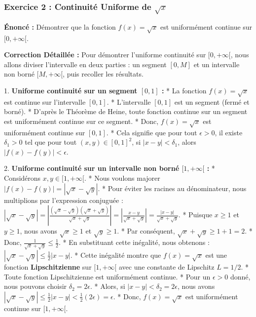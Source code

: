 \documentclass[12pt,a4paper]{report}
\begin{document}
\subsubsection{Exercice 2 : Continuité Uniforme de $\sqrt{x}$}
\textbf{Énoncé :} Démontrer que la fonction $f(x) = \sqrt{x}$ est uniformément continue sur $[0, +\infty[$.

\textbf{Correction Détaillée :}
Pour démontrer l'uniforme continuité sur $[0, +\infty[$, nous allons diviser l'intervalle en deux parties : un segment $[0, M]$ et un intervalle non borné $[M, +\infty[$, puis recoller les résultats.

1.  \textbf{Uniforme continuité sur un segment $[0, 1]$ :}
    *   La fonction $f(x) = \sqrt{x}$ est continue sur l'intervalle $[0, 1]$.
    *   L'intervalle $[0, 1]$ est un segment (fermé et borné).
    *   D'après le Théorème de Heine, toute fonction continue sur un segment est uniformément continue sur ce segment.
    *   Donc, $f(x) = \sqrt{x}$ est uniformément continue sur $[0, 1]$.
    *   Cela signifie que pour tout $\epsilon > 0$, il existe $\delta_1 > 0$ tel que pour tout $(x, y) \in [0, 1]^2$, si $|x - y| < \delta_1$, alors $|f(x) - f(y)| < \epsilon$.

2.  \textbf{Uniforme continuité sur un intervalle non borné $[1, +\infty[$ :}
    *   Considérons $x, y \in [1, +\infty[$.
    *   Nous voulons majorer $|f(x) - f(y)| = |\sqrt{x} - \sqrt{y}|$.
    *   Pour éviter les racines au dénominateur, nous multiplions par l'expression conjuguée :
        $|\sqrt{x} - \sqrt{y}| = \left|\frac{(\sqrt{x} - \sqrt{y})(\sqrt{x} + \sqrt{y})}{\sqrt{x} + \sqrt{y}}\right| = \left|\frac{x - y}{\sqrt{x} + \sqrt{y}}\right| = \frac{|x - y|}{\sqrt{x} + \sqrt{y}}$.
    *   Puisque $x \ge 1$ et $y \ge 1$, nous avons $\sqrt{x} \ge 1$ et $\sqrt{y} \ge 1$.
    *   Par conséquent, $\sqrt{x} + \sqrt{y} \ge 1 + 1 = 2$.
    *   Donc, $\frac{1}{\sqrt{x} + \sqrt{y}} \le \frac{1}{2}$.
    *   En substituant cette inégalité, nous obtenons :
        $|\sqrt{x} - \sqrt{y}| \le \frac{1}{2} |x - y|$.
    *   Cette inégalité montre que $f(x) = \sqrt{x}$ est une fonction \textbf{Lipschitzienne} sur $[1, +\infty[$ avec une constante de Lipschitz $L = 1/2$.
    *   Toute fonction Lipschitzienne est uniformément continue.
    *   Pour un $\epsilon > 0$ donné, nous pouvons choisir $\delta_2 = 2\epsilon$.
    *   Alors, si $|x - y| < \delta_2 = 2\epsilon$, nous avons $|\sqrt{x} - \sqrt{y}| \le \frac{1}{2} |x - y| < \frac{1}{2} (2\epsilon) = \epsilon$.
    *   Donc, $f(x) = \sqrt{x}$ est uniformément continue sur $[1, +\infty[$.
\end{document}
